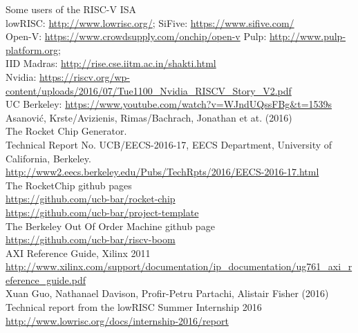 \documentclass[]{beamer} %
\begin{document}



\tiny
\begin{thebibliography}{9}
		Some users of the RISC-V ISA\\
		lowRISC: \url{http://www.lowrisc.org/}; SiFive: \url{https://www.sifive.com/}\\
		Open-V: \url{https://www.crowdsupply.com/onchip/open-v} Pulp: \url{http://www.pulp-platform.org};\\
		IID Madras: \url{http://rise.cse.iitm.ac.in/shakti.html}\\
		Nvidia: \url{https://riscv.org/wp-content/uploads/2016/07/Tue1100_Nvidia_RISCV_Story_V2.pdf}\\
		UC Berkeley: \url{https://www.youtube.com/watch?v=WJndUQssFBg&t=1539s}\\

		Asanović, Krste/Avizienis, Rimas/Bachrach, Jonathan et at. (2016)\\
		The Rocket Chip Generator.\\
		Technical Report No. UCB/EECS-2016-17, EECS Department, University of California, Berkeley.\\
		\url{http://www2.eecs.berkeley.edu/Pubs/TechRpts/2016/EECS-2016-17.html}\\

		The RocketChip github pages\\
		\url{https://github.com/ucb-bar/rocket-chip}\\
		\url{https://github.com/ucb-bar/project-template}\\

		The Berkeley Out Of Order Machine github page\\
		\url{https://github.com/ucb-bar/riscv-boom}\\

		AXI Reference Guide, Xilinx 2011\\
		\url{http://www.xilinx.com/support/documentation/ip_documentation/ug761_axi_reference_guide.pdf}\\

		Xuan Guo, Nathanael Davison, Profir-Petru Partachi, Alistair Fisher (2016)\\
		Technical report from the lowRISC Summer Internship 2016\\
		\url{http://www.lowrisc.org/docs/internship-2016/report}\\


\end{thebibliography}
\end{document}
